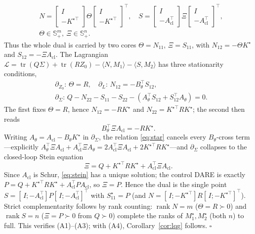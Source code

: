 \documentclass[twocolumn,amsthm]{autart}
\begin{document}
\begin{equation}\label{eq:lift}
\begin{aligned}
&N=\begin{bmatrix}I\\ -K^{\star\top}\end{bmatrix}\Theta
\begin{bmatrix}I\\ -K^{\star\top}\end{bmatrix}^{\!\top}\!,\quad
S=\begin{bmatrix}I\\ -A_{\mathrm{cl}}^\top\end{bmatrix}\Xi
\begin{bmatrix}I\\ -A_{\mathrm{cl}}^\top\end{bmatrix}^{\!\top}\!,\\
&\Theta\in\mathbb S^m_+,\ \Xi\in\mathbb S^n_+ .
\end{aligned}
\end{equation}
Thus the whole dual is carried by two cores $\Theta=N_{11}$, $\Xi=S_{11}$, with
$N_{12}=-\Theta K^\star$ and $S_{12}=-\Xi A_{\mathrm{cl}}$. The Lagrangian
$\mathcal L=\operatorname{tr}(Q\Sigma)+\operatorname{tr}(RZ_0)-\langle N,M_1\rangle
-\langle S,M_2\rangle$ has three stationarity conditions,
\begin{equation}\label{eq:kkt}
\begin{aligned}
&\partial_{Z_0}\!:\,\Theta=R,\quad
\partial_{L}\!:\,N_{12}=-B_\theta^\top S_{12},\\
&\partial_{\Sigma}\!:\,Q-N_{22}-S_{11}-S_{22}-(A_\theta^\top S_{12}+S_{12}^\top A_\theta)=0.
\end{aligned}
\end{equation}
The first fixes $\Theta=R$, hence $N_{12}=-RK^\star$ and $N_{22}=K^{\star\top}RK^\star$;
the second then reads
\begin{equation}\label{eq:star}
B_\theta^\top\Xi A_{\mathrm{cl}}=-RK^\star .
\end{equation}
Writing $A_\theta=A_{\mathrm{cl}}-B_\theta K^\star$ in $\partial_\Sigma$, the
relation \eqref{eq:star} cancels every $B_\theta$-cross term---explicitly
$A_\theta^\top\Xi A_{\mathrm{cl}}+A_{\mathrm{cl}}^\top\Xi A_\theta=
2A_{\mathrm{cl}}^\top\Xi A_{\mathrm{cl}}+2K^{\star\top}RK^\star$---and
$\partial_\Sigma$ collapses to the closed-loop Stein equation
\begin{equation}\label{eq:stein}
\Xi=Q+K^{\star\top}RK^\star+A_{\mathrm{cl}}^\top\Xi A_{\mathrm{cl}} .
\end{equation}
Since $A_{\mathrm{cl}}$ is Schur, \eqref{eq:stein} has a unique solution; the control
DARE is exactly $P=Q+K^{\star\top}RK^\star+A_{\mathrm{cl}}^\top PA_{\mathrm{cl}}$, so
$\Xi=P$. Hence the dual is the single point $S=[\,I;-A_{\mathrm{cl}}^\top]P[\,I;
-A_{\mathrm{cl}}^\top]^\top$ with $S_{11}^\star=P$ (and $N =[\,I; -K^{\star\top}]R[\,I;
-K^{\star\top}]^\top$). Strict complementarity follows by rank counting:
$\operatorname{rank}N=m$ ($\Theta=R\succ0$) and $\operatorname{rank}S=n$
($\Xi=P\succ0$ from $Q\succ0$) complete the ranks of $M_1^\star,M_2^\star$ (both $n$)
to full. This verifies (A1)--(A3); with (A4), Corollary~\ref{cor:lqg} follows.
\hfill$\square$
\end{document}
